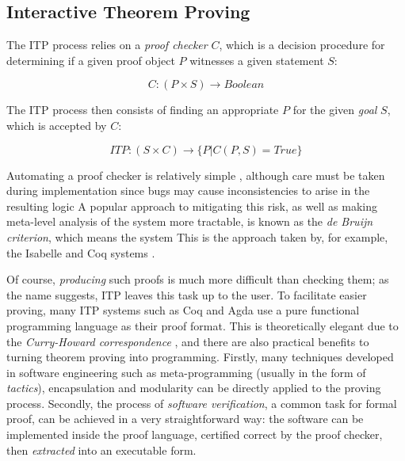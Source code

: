 \documentclass[]{article}
\begin{document}
\subsection{Interactive Theorem Proving}
\label{itp}

The ITP process relies on a \emph{proof checker} $C$, which is a decision procedure for determining if a given proof object $P$ witnesses a given statement $S$:

$$ C : (P \times S) \rightarrow Boolean $$

The ITP process then consists of finding an appropriate $P$ for the given \emph{goal} $S$, which is accepted by $C$:

$$ ITP : (S \times C) \rightarrow \{ P | C(P, S) = True \} $$

Automating a proof checker is relatively simple \cite{boyer1994qed}, although care must be taken during implementation since bugs may cause inconsistencies to arise in the resulting logic \iffalse (for example, TODO: Reference some example, eg. proof of false in Coq). \fi A popular approach to mitigating this risk, as well as making meta-level analysis of the system more tractable, is known as the \emph{de Bruijn criterion}, which means the system  \cite[\S~2]{barendregt2001proof}  \iffalse TODO Maybe Chapter 18. Proof-Assistants Using Dependent Type Systems (Henk Barendregt, Herman Geuvers). instead?. \fi This is the approach taken by, for example, the Isabelle and Coq systems \cite{nipkow2002isabelle} \cite{bertot2013interactive}.



Of course, \emph{producing} such proofs is much more difficult than checking them; as the name suggests, ITP leaves this task up to the user. To facilitate easier proving, many ITP systems such as Coq and Agda use a pure functional programming language as their proof format. This is theoretically elegant due to the \emph{Curry-Howard correspondence} \cite{wadler2015propositions}, and there are also practical benefits to turning theorem proving into programming. Firstly, many techniques developed in software engineering such as meta-programming (usually in the form of \emph{tactics}), encapsulation and modularity can be directly applied to the proving process. Secondly, the process of \emph{software verification}, a common task for formal proof, can be achieved in a very straightforward way: the software can be implemented inside the proof language, certified correct by the proof checker, then \emph{extracted} into an executable form.
\end{document}
